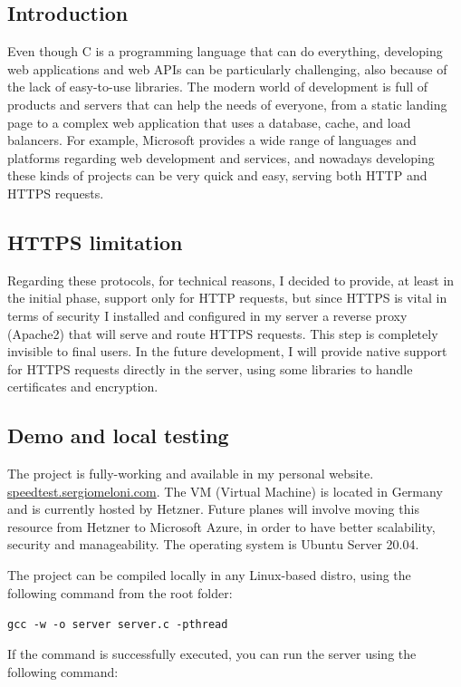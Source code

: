\documentclass{article}
\begin{document}
\subsection{Introduction}
Even though C is a programming language that can do everything, developing web applications and web APIs can be particularly challenging, also because of the lack of easy-to-use libraries. The modern world of development is full of products and servers that can help the needs of everyone, from a static landing page to a complex web application that uses a database, cache, and load balancers. For example, Microsoft provides a wide range of languages and platforms regarding web development and services, and nowadays developing these kinds of projects can be very quick and easy, serving both HTTP and HTTPS requests.

\subsection{HTTPS limitation}
Regarding these protocols, for technical reasons, I decided to provide, at least in the initial phase, support only for HTTP requests, but since HTTPS is vital in terms of security I installed and configured in my server a reverse proxy (Apache2) that will serve and route HTTPS requests. This step is completely invisible to final users. In the future development, I will provide native support for HTTPS requests directly in the server, using some libraries to handle certificates and encryption.

\subsection{Demo and local testing}
The project is fully-working and available in my personal website. \href{https://speedtest.sergiomeloni.com}{speedtest.sergiomeloni.com}. The VM (Virtual Machine) is located in Germany and is currently hosted by Hetzner. Future planes will involve moving this resource from Hetzner to Microsoft Azure, in order to have better scalability, security and manageability. The operating system is Ubuntu Server 20.04.

The project can be compiled locally in any Linux-based distro, using the following command from the root folder:

\texttt{gcc -w -o server server.c -pthread}

If the command is successfully executed, you can run the server using the following command:
\end{document}
